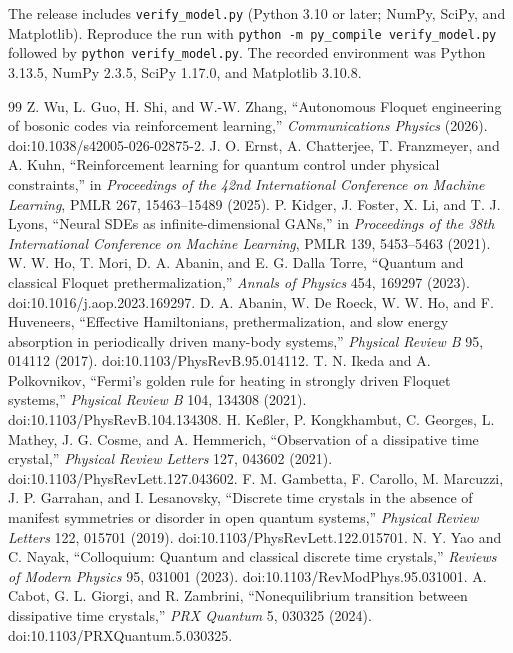 \documentclass[10pt,twoside]{article}
\begin{document}
The release includes \texttt{verify\_model.py} (Python 3.10 or later; NumPy, SciPy, and Matplotlib). Reproduce the run with \texttt{python -m py\_compile verify\_model.py} followed by \texttt{python verify\_model.py}. The recorded environment was Python 3.13.5, NumPy 2.3.5, SciPy 1.17.0, and Matplotlib 3.10.8.
\clearpage
\begin{thebibliography}{99}
 Z. Wu, L. Guo, H. Shi, and W.-W. Zhang, ``Autonomous Floquet engineering of bosonic codes via reinforcement learning,'' \emph{Communications Physics} (2026). doi:10.1038/s42005-026-02875-2.
 J. O. Ernst, A. Chatterjee, T. Franzmeyer, and A. Kuhn, ``Reinforcement learning for quantum control under physical constraints,'' in \emph{Proceedings of the 42nd International Conference on Machine Learning}, PMLR 267, 15463--15489 (2025).
 P. Kidger, J. Foster, X. Li, and T. J. Lyons, ``Neural SDEs as infinite-dimensional GANs,'' in \emph{Proceedings of the 38th International Conference on Machine Learning}, PMLR 139, 5453--5463 (2021).
 W. W. Ho, T. Mori, D. A. Abanin, and E. G. Dalla Torre, ``Quantum and classical Floquet prethermalization,'' \emph{Annals of Physics} 454, 169297 (2023). doi:10.1016/j.aop.2023.169297.
 D. A. Abanin, W. De Roeck, W. W. Ho, and F. Huveneers, ``Effective Hamiltonians, prethermalization, and slow energy absorption in periodically driven many-body systems,'' \emph{Physical Review B} 95, 014112 (2017). doi:10.1103/PhysRevB.95.014112.
 T. N. Ikeda and A. Polkovnikov, ``Fermi's golden rule for heating in strongly driven Floquet systems,'' \emph{Physical Review B} 104, 134308 (2021). doi:10.1103/PhysRevB.104.134308.
 H. Ke{\ss}ler, P. Kongkhambut, C. Georges, L. Mathey, J. G. Cosme, and A. Hemmerich, ``Observation of a dissipative time crystal,'' \emph{Physical Review Letters} 127, 043602 (2021). doi:10.1103/PhysRevLett.127.043602.
 F. M. Gambetta, F. Carollo, M. Marcuzzi, J. P. Garrahan, and I. Lesanovsky, ``Discrete time crystals in the absence of manifest symmetries or disorder in open quantum systems,'' \emph{Physical Review Letters} 122, 015701 (2019). doi:10.1103/PhysRevLett.122.015701.
 N. Y. Yao and C. Nayak, ``Colloquium: Quantum and classical discrete time crystals,'' \emph{Reviews of Modern Physics} 95, 031001 (2023). doi:10.1103/RevModPhys.95.031001.
 A. Cabot, G. L. Giorgi, and R. Zambrini, ``Nonequilibrium transition between dissipative time crystals,'' \emph{PRX Quantum} 5, 030325 (2024). doi:10.1103/PRXQuantum.5.030325.

\end{thebibliography}
\end{document}
